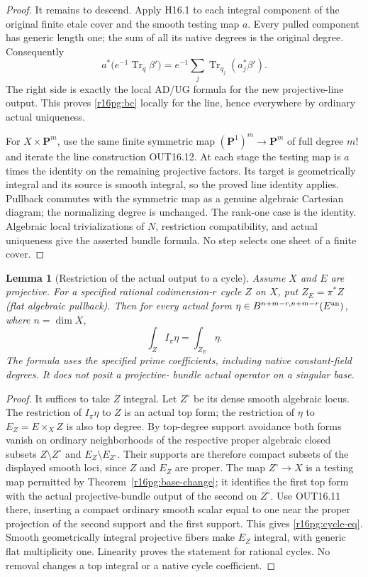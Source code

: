 \documentclass[11pt,a4paper]{article}
\newtheorem{lemma}[theorem]{Lemma}
\theoremstyle{definition}
\theoremstyle{remark}
\numberwithin{equation}{section}
\begin{document}
\begin{proof}
It remains to descend. Apply H16.1 to each integral component of
the original finite etale cover and the smooth testing map $a$.
Every pulled component has generic length one; the sum of all
its native degrees is the original degree. Consequently
\[
 a^*\bigl(e^{-1}\operatorname{Tr}_q\beta'\bigr)
   =e^{-1}\sum_j\operatorname{Tr}_{q_j}(a_j^*\beta').
 \tag{PG16.3}\label{r16pg:descent}
\]
The right side is exactly the local AD/UG formula for the new
projective-line output. This proves \eqref{r16pg:bc} locally for
the line, hence everywhere by ordinary actual uniqueness.

For $X\times\mathbf P^m$, use the same finite symmetric map
$(\mathbf P^1)^m\to\mathbf P^m$ of full degree $m!$ and iterate
the line construction OUT16.12. At each stage the testing map
is $a$ times the identity on the remaining projective factors.
Its target is geometrically integral and its source is smooth
integral, so the proved line identity applies. Pullback commutes
with the symmetric map as a genuine algebraic Cartesian diagram;
the normalizing degree is unchanged. The rank-one case is the
identity. Algebraic local trivializations of $N$, restriction
compatibility, and actual uniqueness give the asserted bundle
formula. No step selects one sheet of a finite cover.
\end{proof}

\begin{lemma}[Restriction of the actual output to a cycle]
\label{r16pg:cycle}
Assume $X$ and $E$ are projective. For a specified rational
codimension-$r$ cycle $Z$ on $X$, put $Z_E=\pi^*Z$ (flat
algebraic pullback). Then for every actual form
$\eta\in B^{n+m-r,n+m-r}(E^{\rm an})$, where $n=\dim X$,
\[
                  \int_Z I_\pi\eta=\int_{Z_E}\eta.
 \tag{PG16.4}\label{r16pg:cycle-eq}
\]
The formula uses the specified prime coefficients, including
native constant-field degrees. It does not posit a projective-
bundle actual operator on a singular base.
\end{lemma}

\begin{proof}
It suffices to take $Z$ integral. Let $Z^\circ$ be its dense
smooth algebraic locus. The restriction of $I_\pi\eta$ to $Z$
is an actual top form; the restriction of $\eta$ to
$E_Z=E\times_X Z$ is also top degree. By top-degree support
avoidance both forms vanish on ordinary neighborhoods of the
respective proper algebraic closed subsets $Z\setminus Z^\circ$
and $E_Z\setminus E_{Z^\circ}$. Their supports are therefore
compact subsets of the displayed smooth loci, since $Z$ and
$E_Z$ are proper. The map $Z^\circ\to X$ is a testing map
permitted by Theorem~\ref{r16pg:base-change}; it identifies the
first top form with the actual projective-bundle output of the
second on $Z^\circ$. Use OUT16.11 there, inserting a compact
ordinary smooth scalar equal to one near the proper projection
of the second support and the first support. This gives
\eqref{r16pg:cycle-eq}. Smooth geometrically integral projective
fibers make $E_Z$ integral, with generic flat multiplicity one.
Linearity proves the statement for rational cycles. No removal
changes a top integral or a native cycle coefficient.
\end{proof}
\end{document}
